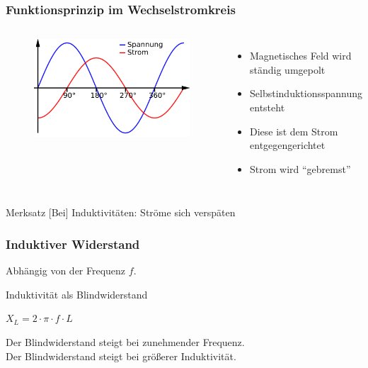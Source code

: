 \begin{frame}
  \frametitle{Funktionsprinzip im Wechselstromkreis}
  \begin{columns}
    \begin{figure}
      \includegraphics[width=1\textwidth,height=.75\textheight,keepaspectratio]{e06/800px-Phasenverschiebung_induktiv.png}
    \end{figure}
    {\small
    \begin{itemize}
      \item Magnetisches Feld wird ständig umgepolt
      \item Selbstinduktionsspannung entsteht
      \item Diese ist dem Strom entgegengerichtet
      \item Strom wird ``gebremst''
    \end{itemize}
    }
  \end{columns}
  \begin{block}{Merksatz}
    [Bei] Induktivitäten: Ströme sich verspäten
  \end{block}
\end{frame}

\begin{frame}
  \frametitle{Induktiver Widerstand}

  Abhängig von der Frequenz $f$.

  \begin{block}{Induktivität als Blindwiderstand}
    \begin{center}
      \huge{$X_L = 2 \cdot \pi \cdot f \cdot L$}
    \end{center}
  \end{block}

  \pause
  Der Blindwiderstand steigt bei zunehmender Frequenz.\\
  Der Blindwiderstand steigt bei größerer Induktivität.
\end{frame}

